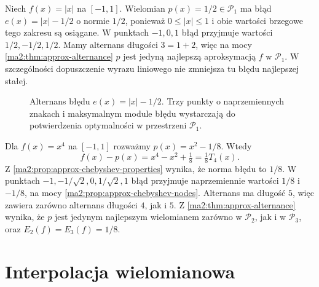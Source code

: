 \begin{przyklad}
\label{ma2:ex:approx-alternance-absolute}
Niech $f(x)=|x|$ na $[-1,1]$.
Wielomian $p(x)=1/2\in\mathcal P_1$ ma błąd
$e(x)=|x|-1/2$ o normie $1/2$, ponieważ
$0\le|x|\le1$ i obie wartości brzegowe
tego zakresu są osiągane.
W punktach $-1,0,1$ błąd przyjmuje
wartości $1/2,-1/2,1/2$.
Mamy alternans długości $3=1+2$,
więc na mocy \ref{ma2:thm:approx-alternance}
$p$ jest jedyną najlepszą aproksymacją
$f$ w $\mathcal P_1$.
W szczególności dopuszczenie wyrazu liniowego
nie zmniejsza tu błędu najlepszej stałej.
\end{przyklad}

\begin{figure}[htbp]
\centering
{}
\caption{Alternans błędu $e(x)=|x|-1/2$.
Trzy punkty o naprzemiennych znakach i maksymalnym
module błędu wystarczają do potwierdzenia
optymalności w przestrzeni $\mathcal P_1$.}
\label{ma2:fig:approx-alternance-absolute}
\end{figure}

\begin{przyklad}
\label{ma2:ex:approx-alternance-quartic}
Dla $f(x)=x^4$ na $[-1,1]$ rozważmy
$p(x)=x^2-1/8$. Wtedy
\[
 f(x)-p(x)=x^4-x^2+\tfrac18=\tfrac18 T_4(x).
\]
Z \ref{ma2:prop:approx-chebyshev-properties}
wynika, że norma błędu to $1/8$.
W punktach
$-1,-1/\sqrt2,0,1/\sqrt2,1$
błąd przyjmuje naprzemiennie wartości
$1/8$ i $-1/8$, na mocy
\ref{ma2:prop:approx-chebyshev-nodes}.
Alternans ma długość $5$, więc zawiera
zarówno alternans długości $4$, jak i $5$.
Z \ref{ma2:thm:approx-alternance}
wynika, że $p$ jest jedynym najlepszym
wielomianem zarówno w $\mathcal P_2$,
jak i w $\mathcal P_3$, oraz
$E_2(f)=E_3(f)=1/8$.
\end{przyklad}

\section{Interpolacja wielomianowa}

